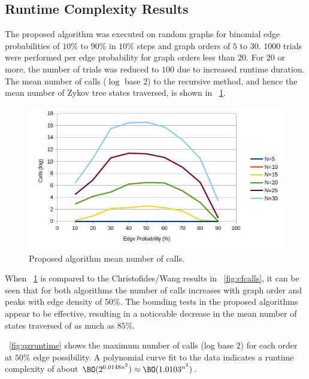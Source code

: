 \subsection{Runtime Complexity Results}\label{sec:sub:runtime}

The proposed algorithm was executed on random graphs for binomial edge probabilities of \(10\%\) to \(90\%\) in
\(10\%\) steps and graph orders of \(5\) to \(30\).  \(1000\) trials were performed per edge probability for graph
orders less than \(20\).  For \(20\) or more, the number of trials was reduced to \(100\) due to increased runtime
duration.  The mean number of calls (\(\log\) base \(2\)) to the recursive method, and hence the mean number of
Zykov tree states traversed, is shown in \figurename~\ref{fig:qzcalls}.

\begin{figure}[H]
  \centering
  \includegraphics[width=5in]{qz_calls}
  \caption{Proposed algorithm mean number of calls.}
  \label{fig:qzcalls}
\end{figure}

When \figurename~\ref{fig:qzcalls} is compared to the Christofides/Wang results in \figurename~\ref{fig:cfcalls},
it can be seen that for both algorithms the number of calls increases with graph order and peaks with edge density
of \(50\%\).  The bounding tests in the proposed algorithms appear to be effective, resulting in a noticeable
decrease in the mean number of states traversed of as much as \(85\%\).

\figurename~\ref{fig:qzruntime} shows the maximum number of calls (log base 2) for each order at \(50\%\) edge
possibility.  A polynomial curve fit to the data indicates a runtime complexity of about
\(\BO(2^{0.0148n^2})\approx\BO(1.0103^{n^2})\).

